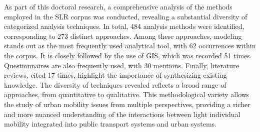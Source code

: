 \begin{refsegment}
As part of this doctoral research, a comprehensive analysis of the methods employed in the \acrshort{SLR} corpus was conducted, revealing a substantial diversity of categorized analysis techniques. In total, 484 analysis methods were identified, corresponding to 273 distinct approaches. Among these approaches, modeling stands out as the most frequently used analytical tool, with 62 occurrences within the corpus. It is closely followed by the use of \acrfull{GIS}, which was recorded 51 times. Questionnaires are also frequently used, with 30 mentions. Finally, literature reviews, cited 17 times, highlight the importance of synthesizing existing knowledge. The diversity of techniques revealed reflects a broad range of approaches, from quantitative to qualitative. This methodological variety allows the study of urban mobility issues from multiple perspectives, providing a richer and more nuanced understanding of the interactions between light individual mobility integrated into public transport systems and urban systems.%


\end{refsegment}
